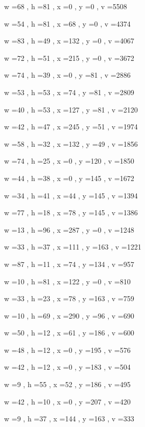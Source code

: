 \documentclass[11pt]{article}
\begin{document}
w =68 , h =81 , x =0 , y =0 , v =5508
\par
w =54 , h =81 , x =68 , y =0 , v =4374
\par
w =83 , h =49 , x =132 , y =0 , v =4067
\par
w =72 , h =51 , x =215 , y =0 , v =3672
\par
w =74 , h =39 , x =0 , y =81 , v =2886
\par
w =53 , h =53 , x =74 , y =81 , v =2809
\par
w =40 , h =53 , x =127 , y =81 , v =2120
\par
w =42 , h =47 , x =245 , y =51 , v =1974
\par
w =58 , h =32 , x =132 , y =49 , v =1856
\par
w =74 , h =25 , x =0 , y =120 , v =1850
\par
w =44 , h =38 , x =0 , y =145 , v =1672
\par
w =34 , h =41 , x =44 , y =145 , v =1394
\par
w =77 , h =18 , x =78 , y =145 , v =1386
\par
w =13 , h =96 , x =287 , y =0 , v =1248
\par
w =33 , h =37 , x =111 , y =163 , v =1221
\par
w =87 , h =11 , x =74 , y =134 , v =957
\par
w =10 , h =81 , x =122 , y =0 , v =810
\par
w =33 , h =23 , x =78 , y =163 , v =759
\par
w =10 , h =69 , x =290 , y =96 , v =690
\par
w =50 , h =12 , x =61 , y =186 , v =600
\par
w =48 , h =12 , x =0 , y =195 , v =576
\par
w =42 , h =12 , x =0 , y =183 , v =504
\par
w =9 , h =55 , x =52 , y =186 , v =495
\par
w =42 , h =10 , x =0 , y =207 , v =420
\par
w =9 , h =37 , x =144 , y =163 , v =333
\par
\newpage
\end{document}
